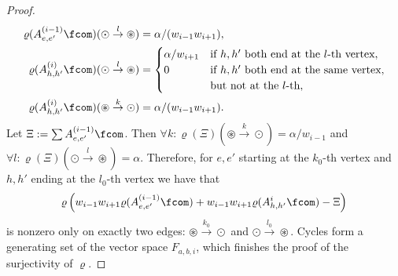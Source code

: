 \begin{proof}
\begin{align*}
\varrho(A^{(i-1)}_{e,e'}\fcom)(\odot\overset l\to\circledast)&=\alpha/(w_{i-1}w_{i+1}),\\
\varrho(A^{(i)}_{h,h'}\fcom)(\odot\overset l\to\circledast)&=\begin{cases}\alpha/w_{i+1}&\text{if }h,h'\text{ both end at the }l\text{-th vertex},\\0&\text{if }h,h'\text{ both end at the same vertex,}\\&\text{but not at the }l\text{-th},\end{cases}\\
\varrho(A^{(i)}_{h,h'}\fcom)(\circledast\overset k\to\odot)&=\alpha/(w_{i-1}w_{i+1}).
\end{align*}
Let $\Xi:=\sum A^{(i-1)}_{e,e'}\fcom$. Then $\forall k:\varrho(\Xi)(\circledast\overset k\to\odot)=\alpha/w_{i-1}$ and $\forall l:\varrho(\Xi)(\odot\overset l\to\circledast)=\alpha$. Therefore, for $e,e'$ starting at the $k_0$-th vertex and $h,h'$ ending at the $l_0$-th vertex we have that
\[\varrho\left(w_{i-1}w_{i+1}\varrho(A^{(i-1)}_{e,e'}\fcom)+w_{i-1}w_{i+1}\varrho(A^i_{h,h'}\fcom)-\Xi\right)\]
is nonzero only on exactly two edges: $\circledast\overset{k_0}\to\odot$ and $\odot\overset{l_0}\to\circledast$. Cycles form a generating set of the vector space $F_{a,b,i}$, which finishes the proof of the surjectivity of $\varrho$.
\end{proof}
